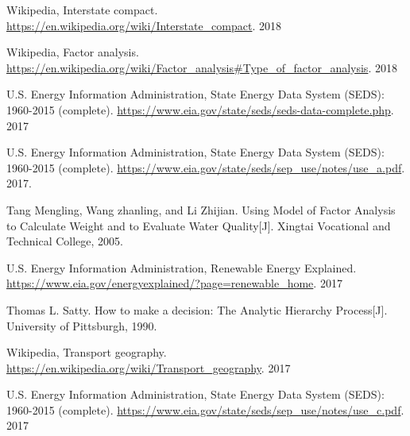 \documentclass[a4paper,11pt]{article}
\begin{document}
\newpage%
\begin{thebibliography}{}
%
%
Wikipedia, Interstate compact. \url{https://en.wikipedia.org/wiki/Interstate_compact}. 2018

Wikipedia, Factor analysis. \url{https://en.wikipedia.org/wiki/Factor_analysis#Type_of_factor_analysis}. 2018

U.S. Energy Information Administration, State Energy Data System (SEDS): 1960-2015 (complete). \url{https://www.eia.gov/state/seds/seds-data-complete.php}. 2017

U.S. Energy Information Administration, State Energy Data System (SEDS): 1960-2015 (complete). \url{https://www.eia.gov/state/seds/sep_use/notes/use_a.pdf}. 2017.

Tang Mengling, Wang zhanling, and Li Zhijian. Using Model of Factor Analysis to Calculate Weight and to Evaluate Water Quality[J]. Xingtai Vocational and Technical College, 2005.

U.S. Energy Information Administration, Renewable Energy Explained. \url{https://www.eia.gov/energyexplained/?page=renewable_home}. 2017


Thomas L. Satty. How to make a decision: The Analytic Hierarchy Process[J]. University of Pittsburgh, 1990.

Wikipedia, Transport geography. \url{https://en.wikipedia.org/wiki/Transport_geography}. 2017

U.S. Energy Information Administration, State Energy Data System (SEDS): 1960-2015 (complete). \url{https://www.eia.gov/state/seds/sep_use/notes/use_c.pdf}. 2017


\end{thebibliography}
\end{document}
